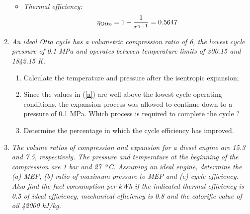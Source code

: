\begin{enumerate}
\begin{itemize}
\item {\it Thermal efficiency:}
\begin{displaymath}
\eta_{\text{Otto}}=1- \displaystyle\frac{1}{r^{\gamma-1}} = 0.5647
\end{displaymath}
%
\end{itemize}


\item {\it An ideal Otto cycle has a volumetric compression ratio of 6, the lowest cycle pressure of 0.1 MPa and operates between temperature limits of 300.15 and 1842.15 K.
\begin{enumerate}
\item \label{a}Calculate the temperature and pressure after the isentropic expansion;
\item Since the values in (\ref{a}) are well above the lowest cycle operating conditions, the expansion process was allowed to continue down to a pressure of 0.1 MPa. Which process is required to complete the cycle ? 
\item  Determine the percentage in which the cycle efficiency has improved.
\end{enumerate}
}



\item {\it The volume ratios of compression and expansion for a diesel engine are 15.3 and 7.5, respectively. The pressure and temperature at the beginning of the compression are 1 bar and 27 $^{\text{ o}}$C. Assuming an ideal engine, determine the (a) MEP, (b) ratio of maximum pressure to MEP and (c) cycle efficiency. Also find the fuel consumption per kWh if the indicated thermal efficiency is 0.5 of ideal efficiency, mechanical efficiency is 0.8 and the calorific value of oil 42000 kJ/kg. }



\end{enumerate}
